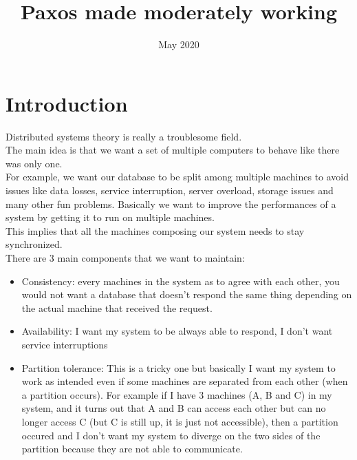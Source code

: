 \documentclass{article}
\title{Paxos made moderately working}
\date{May 2020}
\begin{document}
\maketitle
\tableofcontents
\pagebreak

\section{Introduction}
Distributed systems theory is really a troublesome field.\\
The main idea is that we want a set of multiple computers to behave like there was only one.\\
For example, we want our database to be split among multiple machines to avoid issues like data losses, service interruption, server overload, storage issues and many other fun problems. Basically we want to improve the performances of a system by getting it to run on multiple machines.\\
This implies that all the machines composing our system needs to stay synchronized.\\
There are 3 main components that we want to maintain:
\begin{itemize}
    \item Consistency: every machines in the system as to agree with each other, you would not want a database that doesn't respond the same thing depending on the actual machine that received the request.
    \item Availability: I want my system to be always able to respond, I don't want service interruptions
    \item Partition tolerance: This is a tricky one but basically I want my system to work as intended even if some machines are separated from each other (when a partition occurs). For example if I have 3 machines (A, B and C) in my system, and it turns out that A and B can access each other but can no longer access C (but C is still up, it is just not accessible), then a partition occured and I don't want my system to diverge on the two sides of the partition because they are not able to communicate.
\end{itemize}
\end{document}
